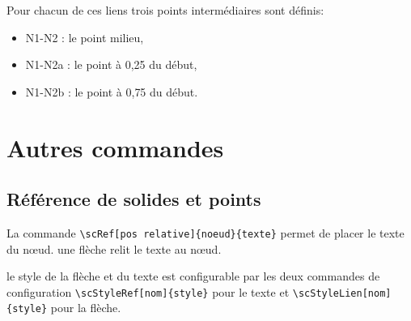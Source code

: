 \documentclass[a4paper,11pt]{article}                      %
\begin{document}
Pour chacun de ces liens trois points intermédiaires sont définis:
\begin{itemize}
\item N1-N2 : le point milieu,
\item N1-N2a : le point à 0{,}25 du début,
\item N1-N2b : le point à 0{,}75 du début.
\end{itemize}


\section{Autres commandes}

\subsection{Référence de solides et points}

La commande \verb"\scRef[pos relative]{noeud}{texte}"  permet de placer le texte du n\oe ud. une flèche relit le texte au n\oe ud.

le style de la flèche et du texte est configurable par les deux commandes de configuration \verb"\scStyleRef[nom]{style}"  pour le texte et \verb"\scStyleLien[nom]{style}" pour la flèche.
\end{document}
